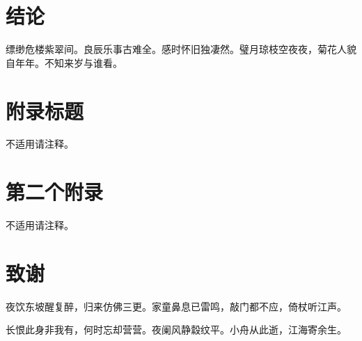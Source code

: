 \documentclass[12pt,journal,onecolumn]{IEEEtran}
\begin{document}
\section{结论}

缥缈危楼紫翠间。良辰乐事古难全。感时怀旧独凄然。璧月琼枝空夜夜，菊花人貌自年年。不知来岁与谁看。

\patchcmd{\section}{\raggedright}{\centering}{}{}
\patchcmd{\section}{\normalsize}{\large\bfseries}{}{}

\appendices
\section{附录标题}
不适用请注释。

\section{第二个附录}
不适用请注释。


\section*{致谢}

夜饮东坡醒复醉，归来仿佛三更。家童鼻息已雷鸣，敲门都不应，倚杖听江声。

长恨此身非我有，何时忘却营营。夜阑风静縠纹平。小舟从此逝，江海寄余生。

\ 


\ifCLASSOPTIONcaptionsoff
  \newpage
\fi




\end{document}

